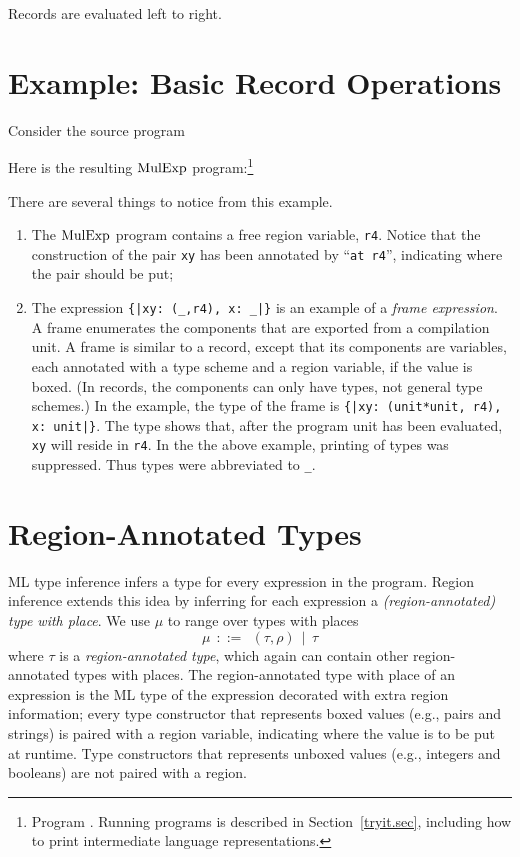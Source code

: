\documentclass[12pt]{book}
\begin{document}
Records are evaluated left to right.

\section{Example: Basic Record Operations}
\label{proj.ex}

Consider the source program
Here is the resulting $\hbox{\rm MulExp}$ program:\footnote{Program
  . Running programs is described in
  Section~\ref{tryit.sec}, including how to print intermediate language representations.}
There are several things to notice from this example.
\begin{enumerate}
\item The $\hbox{\rm MulExp}$ program contains a free region variable, \lstinline{r4}.
  Notice that the construction of the pair \lstinline{xy} has been annotated by
  ``\lstinline{at r4}'', indicating where the pair should be put;
\item The expression \lstinline+{|xy: (_,r4), x: _|}+ is an example of a
  {\em frame expression}. A frame enumerates the components that are exported
  from a compilation unit.  A frame is similar to a record, except that its
  components are variables, each annotated with a type scheme and a region
  variable, if the value is boxed. (In records, the components can only have
  types, not general type schemes.) In the example, the type of the frame is
  \lstinline+{|xy: (unit*unit, r4), x: unit|}+.  The type shows that, after the
  program unit has been evaluated, \lstinline{xy} will reside in \lstinline{r4}.  In the
  the above example, printing of types was suppressed. Thus types were
  abbreviated to \lstinline{_}.
\end{enumerate}

\section{Region-Annotated Types}
\label{reganntypes.sec}

ML type inference infers a type for every expression in the program.
Region inference extends this idea by inferring for each expression a
%
%
%
{\em (region-annotated) type with place}. We use $\mu$ to range over
types with places
$$\mu ~~ ::= ~~ (\tau,\rho)~~|~~\tau$$ where $\tau$ is a {\em region-annotated
  type}, which again can contain other region-annotated types with places. The
region-annotated type with place of an expression is the ML type of the
expression decorated with extra region information; every type constructor that
represents boxed values (e.g., pairs and strings) is paired with a region
variable, indicating where the value is to be put at runtime. Type constructors
that represents unboxed values (e.g., integers and booleans) are not paired with
a region.
%
%
%
%
\end{document}
